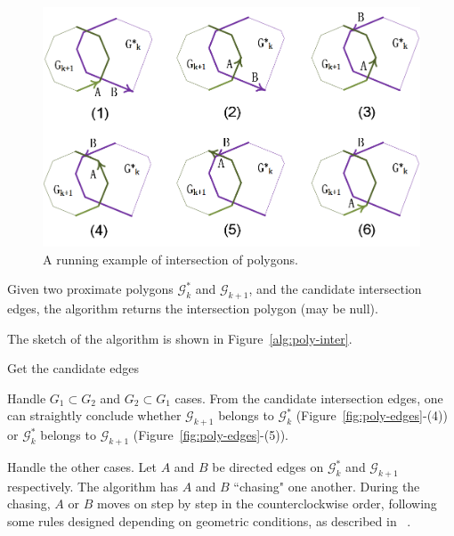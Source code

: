 \begin{figure}[tb!]
\centering
\includegraphics[scale=0.88]{figures/Fig-poly-inter.png}
\vspace{-1ex}
\caption{\small A running example of intersection of polygons.}
\vspace{-2ex}
\label{fig:p-poly-inter}
\end{figure}


\stitle{\textcolor[rgb]{0.00,0.07,1.00}{polygon intersection algorithm}}
Given two proximate polygons $\mathcal{G}^*_k$ and $\mathcal{G}_{k+1}$, and the candidate intersection edges, the algorithm returns the intersection polygon (may be null).

The sketch of the algorithm is shown in Figure~\ref{alg:poly-inter}.

Get the candidate edges

Handle $G_1 \subset G_2$ and $G_2 \subset G_1$ cases.
From the candidate intersection edges, one can straightly conclude whether $\mathcal{G}_{k+1}$ belongs to $\mathcal{G}^*_{k}$ (Figure~\ref{fig:poly-edges}-(4)) or $\mathcal{G}^*_{k}$ belongs to $\mathcal{G}_{k+1}$ (Figure~\ref{fig:poly-edges}-(5)).

%

Handle the other cases.
Let $A$ and $B$ be directed edges on $\mathcal{G}^*_k$ and $\mathcal{G}_{k+1}$ respectively. The algorithm has $A$ and $B$ ``chasing" one another. During the chasing, $A$ or $B$ moves on step by step in the counterclockwise order, following some rules designed depending on geometric conditions, as described in ~\cite{ORourke:Intersection}.


